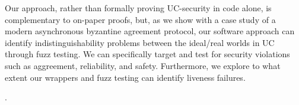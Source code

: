 Our approach, rather than formally proving UC-security in code alone, is complementary to on-paper proofs, but, as we show with a case study of a modern asynchronous byzantine agreement protocol, our software approach can identify indistinguishability problems between the ideal/real worlds in UC through fuzz testing. 
We can specifically target and test for security violations such as aggreement, reliability, and safety. 
Furthermore, we explore to what extent our wrappers and fuzz testing can identify liveness failures.

.
